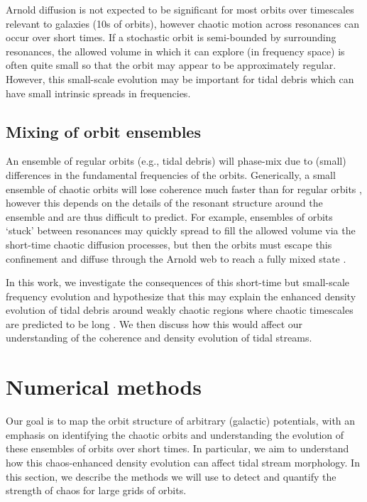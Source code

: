 \documentclass[letterpaper,12pt,preprint]{aastex}
\begin{document}
Arnold diffusion is not expected to be significant for most orbits over timescales relevant to galaxies (10s of orbits), however chaotic motion across resonances can occur over short times. If a stochastic orbit is semi-bounded by surrounding resonances, the allowed volume in which it can explore (in frequency space) is often quite small so that the orbit may appear to be approximately regular. However, this small-scale evolution may be important for tidal debris which can have small intrinsic spreads in frequencies.

\subsection{Mixing of orbit ensembles}\label{sec:chaotic-mixing}

An ensemble of regular orbits (e.g., tidal debris) will phase-mix due to (small) differences in the fundamental frequencies of the orbits. Generically, a small ensemble of chaotic orbits will lose coherence much faster than for regular orbits \cite[see, e.g.,][]{kandrup94, merritt96, kandrup03}, however this depends on the details of the resonant structure around the ensemble and are thus difficult to predict. For example,  ensembles of orbits `stuck' between resonances may quickly spread to fill the allowed volume via the short-time chaotic diffusion processes, but then the orbits must escape this confinement and diffuse through the Arnold web to reach a fully mixed state \citep{merritt96}.

In this work, we investigate the consequences of this short-time but small-scale frequency evolution and hypothesize that this may explain the enhanced density evolution of tidal debris around weakly chaotic regions where chaotic timescales are predicted to be long \citep[e.g.,][]{pearson15}. We then discuss how this would affect our understanding of the coherence and density evolution of tidal streams.

\section{Numerical methods}\label{sec:methods}

Our goal is to map the orbit structure of arbitrary (galactic) potentials, with an emphasis on identifying the chaotic orbits and understanding the evolution of these ensembles of orbits over short times. In particular, we aim to understand how this chaos-enhanced density evolution can affect tidal stream morphology. In this section, we describe the methods we will use to detect and quantify the strength of chaos for large grids of orbits.
\end{document}
